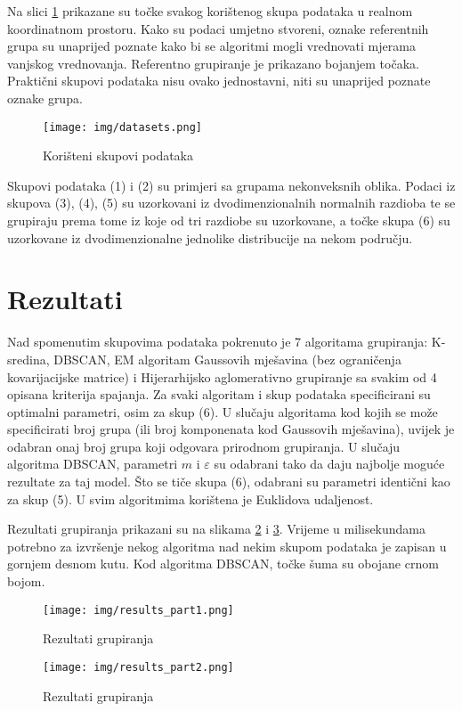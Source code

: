 \documentclass[times, utf8, zavrsni]{fer}
\begin{document}
Na slici \ref{fig:datasets} prikazane su točke svakog korištenog skupa podataka u realnom koordinatnom prostoru. Kako su podaci umjetno stvoreni, oznake referentnih grupa su unaprijed poznate kako bi se algoritmi mogli vrednovati mjerama vanjskog vrednovanja. Referentno grupiranje je prikazano bojanjem točaka. Praktični skupovi podataka nisu ovako jednostavni, niti su unaprijed poznate oznake grupa.

\begin{figure}[H]
    \centering
    \texttt{[image: img/datasets.png]}
    \caption{Korišteni skupovi podataka}
    \label{fig:datasets}
\end{figure}

Skupovi podataka (1) i (2) su primjeri sa grupama nekonveksnih oblika. Podaci iz skupova (3), (4), (5) su uzorkovani iz dvodimenzionalnih normalnih razdioba te se grupiraju prema tome iz koje od tri razdiobe su uzorkovane, a točke skupa (6) su uzorkovane iz dvodimenzionalne jednolike distribucije na nekom području.

\section{Rezultati}

Nad spomenutim skupovima podataka pokrenuto je 7 algoritama grupiranja: K-sredina, DBSCAN, EM algoritam Gaussovih mješavina (bez ograničenja kovarijacijske matrice) i Hijerarhijsko aglomerativno grupiranje sa svakim od 4 opisana kriterija spajanja. Za svaki algoritam i skup podataka specificirani su optimalni parametri, osim za skup (6). U slučaju algoritama kod kojih se može specificirati broj grupa (ili broj komponenata kod Gaussovih mješavina), uvijek je odabran onaj broj grupa koji odgovara prirodnom grupiranja. U slučaju algoritma DBSCAN, parametri $m$ i $\varepsilon$ su odabrani tako da daju najbolje moguće rezultate za taj model. Što se tiče skupa (6), odabrani su parametri identični kao za skup (5). U svim algoritmima korištena je Euklidova udaljenost.

Rezultati grupiranja prikazani su na slikama \ref{fig:resultspart1} i \ref{fig:resultspart2}. Vrijeme u milisekundama potrebno za izvršenje nekog algoritma nad nekim skupom podataka je zapisan u gornjem desnom kutu. Kod algoritma DBSCAN, točke šuma su obojane crnom bojom.

\begin{figure}[H]
    \centering
    \texttt{[image: img/results\_part1.png]}
    \caption{Rezultati grupiranja}
    \label{fig:resultspart1}
\end{figure}
\begin{figure}[H]
    \centering
    \texttt{[image: img/results\_part2.png]}
    \caption{Rezultati grupiranja}
    \label{fig:resultspart2}
\end{figure}
\end{document}
